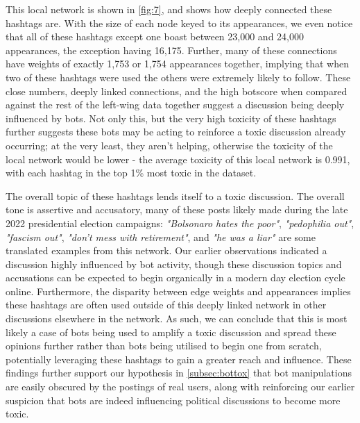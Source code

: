 \documentclass[a4paper,11pt]{article}  %
\begin{document}
	This local network is shown in \autoref{fig:7}, and shows how deeply connected these hashtags are. With the size of each node keyed to its appearances, we even notice that all of these hashtags except one boast between 23,000 and 24,000 appearances, the exception having 16,175. Further, many of these connections have weights of exactly 1,753 or 1,754 appearances together, implying that when two of these hashtags were used the others were extremely likely to follow. These close numbers, deeply linked connections, and the high botscore when compared against the rest of the left-wing data together suggest a discussion being deeply influenced by bots. Not only this, but the very high toxicity of these hashtags further suggests these bots may be acting to reinforce a toxic discussion already occurring; at the very least, they aren't helping, otherwise the toxicity of the local network would be lower - the average toxicity of this local network is 0.991, with each hashtag in the top 1\% most toxic in the dataset.
	
	The overall topic of these hashtags lends itself to a toxic discussion. The overall tone is assertive and accusatory, many of these posts likely made during the late 2022 presidential election campaigns: \textit{"Bolsonaro hates the poor"}, \textit{"pedophilia out"}, \textit{"fascism out"}, \textit{"don't mess with retirement"}, and \textit{"he was a liar"} are some translated examples from this network. Our earlier observations indicated a discussion highly influenced by bot activity, though these discussion topics and accusations can be expected to begin organically in a modern day election cycle online. Furthermore, the disparity between edge weights and appearances implies these hashtags are often used outside of this deeply linked network in other discussions elsewhere in the network. As such, we can conclude that this is most likely a case of bots being used to amplify a toxic discussion and spread these opinions further rather than bots being utilised to begin one from scratch, potentially leveraging these hashtags to gain a greater reach and influence. These findings further support our hypothesis in \autoref{subsec:bottox} that bot manipulations are easily obscured by the postings of real users, along with reinforcing our earlier suspicion that bots are indeed influencing political discussions to become more toxic.
	
\end{document}
